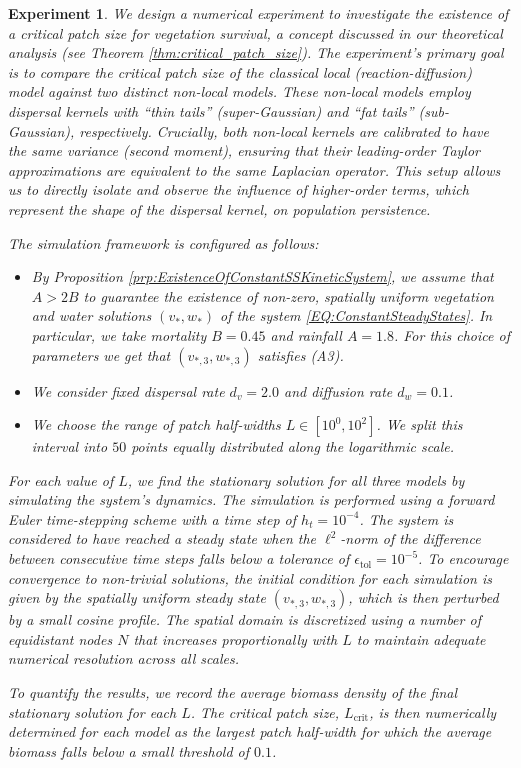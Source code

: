 \documentclass[11pt, a4paper]{article}
\theoremstyle{break}
\theoremstyle{break}
\theoremstyle{break}
\theoremstyle{break}
\theoremstyle{break}
\theoremstyle{break}
\theoremstyle{break}
\theoremstyle{break}
\theoremstyle{break}
\newtheorem{expe}{Experiment}[section]
\theoremstyle{break}
\begin{document}
\begin{expe}
    \label{exp:experiment_critical_patch_size}
    We design a numerical experiment to investigate the existence of a critical patch size for vegetation survival, a concept discussed in our theoretical analysis (see Theorem \ref{thm:critical_patch_size}). The experiment's primary goal is to compare the critical patch size of the classical local (reaction-diffusion) model against two distinct non-local models. These non-local models employ dispersal kernels with ``thin tails'' (super-Gaussian) and ``fat tails'' (sub-Gaussian), respectively. Crucially, both non-local kernels are calibrated to have the same variance (second moment), ensuring that their leading-order Taylor approximations are equivalent to the same Laplacian operator. This setup allows us to directly isolate and observe the influence of higher-order terms, which represent the shape of the dispersal kernel, on population persistence.
    
    The simulation framework is configured as follows:
    \begin{itemize}
        \item By Proposition \ref{prp:ExistenceOfConstantSSKineticSystem}, we assume that $A > 2B$ to guarantee the existence of non-zero, spatially uniform vegetation and water solutions $(v_*, w_*)$ of the system \eqref{EQ:ConstantSteadyStates}. In particular, we take mortality $B = 0.45$ and rainfall $A = 1.8$. For this choice of parameters we get that $(v_{*, 3}, w_{*, 3})$ satisfies (A3).
        \item We consider fixed dispersal rate $d_v = 2.0$ and diffusion rate $d_w = 0.1$.
        \item We choose the range of patch half-widths $L \in [10^{0}, 10^2]$. We split this interval into $50$ points equally distributed along the logarithmic scale.
    \end{itemize}
    For each value of $L$, we find the stationary solution for all three models by simulating the system's dynamics. The simulation is performed using a forward Euler time-stepping scheme with a time step of $h_t = 10^{-4}$. The system is considered to have reached a steady state when the $\ell^2$-norm of the difference between consecutive time steps falls below a tolerance of $\epsilon_{\text{tol}} = 10^{-5}$. To encourage convergence to non-trivial solutions, the initial condition for each simulation is given by the spatially uniform steady state $(v_{*,3}, w_{*,3})$, which is then perturbed by a small cosine profile. The spatial domain is discretized using a number of equidistant nodes $N$ that increases proportionally with $L$ to maintain adequate numerical resolution across all scales.

    To quantify the results, we record the average biomass density of the final stationary solution for each $L$. The critical patch size, $L_{\text{crit}}$, is then numerically determined for each model as the largest patch half-width for which the average biomass falls below a small threshold of $0.1$.
\end{expe}
\end{document}
